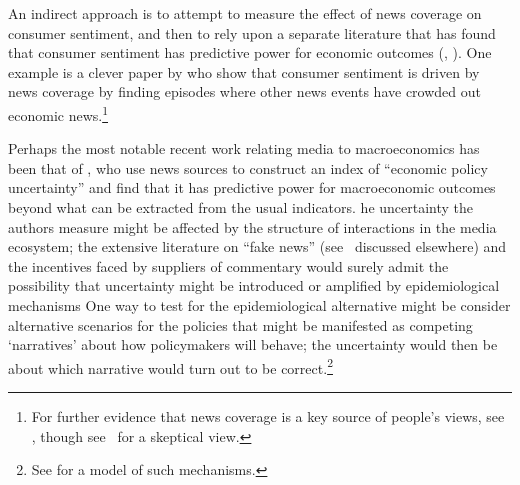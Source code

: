An indirect approach is to attempt to measure the effect of news coverage on consumer sentiment, and then to rely upon a separate literature that has found that consumer sentiment has predictive power for economic outcomes (\cite{ludvigson2004consumer}, \cite{cfwSentiment}).  One example is a clever paper by \cite{doms2004consumer} who show that consumer sentiment is driven by news coverage by finding episodes where other news events have crowded out economic news.\footnote{For further evidence that news coverage is a key source of people's views, see \cite{lamla2012role}, though see~\cite{pfajfar2013news} for a skeptical view.}




Perhaps the most notable recent work relating media to macroeconomics has been that of \cite{baker2016measuring}, who use news sources to construct an index of ``economic policy uncertainty'' and find that it has predictive power for macroeconomic outcomes beyond what can be extracted from the usual indicators.  he uncertainty the authors measure might be affected by the structure of interactions in the media ecosystem; the extensive literature on ``fake news'' (see~\cite{allcott2017social} discussed elsewhere) and the incentives faced by suppliers of commentary would surely admit the possibility that uncertainty might be introduced or amplified by epidemiological mechanisms   One way to test for the epidemiological alternative might be consider alternative scenarios for the policies that might be manifested as competing `narratives' about how policymakers will behave; the uncertainty would then be about which narrative would turn out to be correct.\footnote{See \cite{eliaz2020model} for a model of such mechanisms.}

